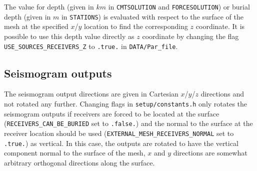 The value for depth (given in $km$ in \texttt{CMTSOLUTION} and \texttt{FORCESOLUTION})
or burial depth (given in $m$ in \texttt{STATIONS}) is evaluated
with respect to the surface of the mesh at the specified $x$/$y$
location to find the corresponding $z$ coordinate. It is possible
to use this depth value directly as $z$ coordinate by changing the
flag \texttt{USE\_SOURCES\_RECEIVERS\_Z} to \texttt{.true.} in
\texttt{DATA/Par\_file}.\newline


\subsection*{Seismogram outputs}

The seismogram output directions are given in Cartesian $x$/$y$/$z$
directions and not rotated any further. Changing flags in \texttt{setup/constants.h} only rotates the seismogram
outputs if receivers are forced to be located at the surface (\texttt{RECEIVERS\_CAN\_BE\_BURIED}
set to \texttt{.false.}) and the normal to the surface at the receiver
location should be used (\texttt{EXTERNAL\_MESH\_RECEIVERS\_NORMAL} set to \texttt{.true.})
as vertical. In this case, the outputs are rotated to have the vertical
component normal to the surface of the mesh, $x$ and $y$ directions
are somewhat arbitrary orthogonal directions along the surface.\newline

